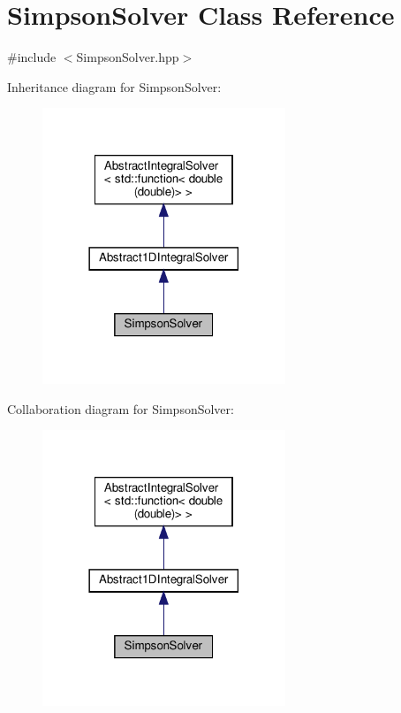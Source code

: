 \hypertarget{class_simpson_solver}{}\section{Simpson\+Solver Class Reference}
\label{class_simpson_solver}


{\ttfamily \#include $<$Simpson\+Solver.\+hpp$>$}



Inheritance diagram for Simpson\+Solver\+:
\nopagebreak
\begin{figure}[H]
\begin{center}
\leavevmode
\includegraphics[width=206pt]{class_simpson_solver__inherit__graph}
\end{center}
\end{figure}


Collaboration diagram for Simpson\+Solver\+:
\nopagebreak
\begin{figure}[H]
\begin{center}
\leavevmode
\includegraphics[width=206pt]{class_simpson_solver__coll__graph}
\end{center}
\end{figure}

